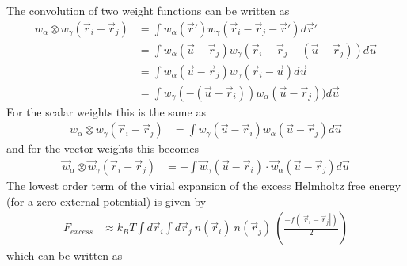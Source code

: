 \documentclass[double,12pt]{beavtex}
\begin{document}
The convolution of two weight functions can be written as
\begin{align}
     w_\alpha\otimes w_\gamma(\vec r_i - \vec r_j) &= \int w_\alpha(\vec r') w_\gamma(\vec r_i -\vec r_j - \vec r') d\vec r'   \\                                                             
                                                   &= \int w_\alpha(\vec u - \vec r_j) w_\gamma(\vec r_i -\vec r_j -(\vec u - \vec r_j))d\vec u     \\                                                               
                                                   &= \int w_\alpha(\vec u - \vec r_j) w_\gamma(\vec r_i - \vec u) d\vec u  \\  
                                                   &= \int w_\gamma(-(\vec u - \vec r_i))w_\alpha(\vec u - \vec r_j))  d\vec u  
\end{align}
For the scalar weights this is the same as
\begin{align} 
     w_\alpha\otimes w_\gamma(\vec r_i - \vec r_j) &= \int w_\gamma(\vec u - \vec r_i)w_\alpha(\vec u - \vec r_j)  d\vec u  
\end{align}
and for the vector weights this becomes
\begin{align} 
     \vec w_\alpha\otimes \vec w_\gamma(\vec r_i - \vec r_j) &= -\int \vec {w}_\gamma(\vec u - \vec r_i)\cdot\vec {w}_\alpha(\vec u - \vec r_j)  d\vec u  
\end{align}
%
The lowest order term of the virial expansion of the excess Helmholtz 
free energy (for a zero external potential) is given by
\begin{align}
     F_{excess} &\approx k_BT\int d\vec r_i \int d\vec r_j~n(\vec r_i)~n(\vec r_j)~\left(\frac{-f(|\vec r_i-\vec r_j|)}{2}\right)  
\end{align} 
which can be written as 
\end{document}
